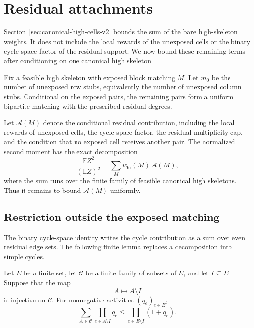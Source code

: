 
\section{Residual attachments}
\label{sec:residual-attachments-v2}

Section~\ref{sec:canonical-high-cells-v2} bounds the sum of the bare
high-skeleton weights.  It does not include the local rewards of the unexposed
cells or the binary cycle-space factor of the residual support.  We now bound
these remaining terms after conditioning on one canonical high skeleton.

Fix a feasible high skeleton with exposed block matching $M$.  Let $m_0$ be the
number of unexposed row stubs, equivalently the number of unexposed column
stubs.  Conditional on the exposed pairs, the remaining pairs form a uniform
bipartite matching with the prescribed residual degrees.

Let $\mathcal A(M)$ denote the conditional residual contribution, including the
local rewards of unexposed cells, the cycle-space factor, the residual
multiplicity cap, and the condition that no exposed cell receives another
pair.  The normalized second moment has the exact decomposition
\begin{equation}
  \frac{\mathbb E Z^2}{(\mathbb E Z)^2}
  =
  \sum_M w_{\mathrm{hi}}(M)\,\mathcal A(M),
  \label{eq:exact-attachment-decomposition-v2}
\end{equation}
where the sum runs over the finite family of feasible canonical high
skeletons.  Thus it remains to bound $\mathcal A(M)$ uniformly.

\subsection{Restriction outside the exposed matching}

The binary cycle-space identity writes the cycle contribution as a sum over
even residual edge sets.  The following finite lemma replaces a decomposition
into simple cycles.

\begin{lemma}
\label{lem:restriction-product-v2}
Let $E$ be a finite set, let $\mathcal C$ be a finite family of subsets of
$E$, and let $I\subseteq E$.  Suppose that the map
\[
  A\longmapsto A\setminus I
\]
is injective on $\mathcal C$.  For nonnegative activities $(q_e)_{e\in E}$,
\[
  \sum_{A\in\mathcal C}
    \prod_{e\in A\setminus I}q_e
  \le
  \prod_{e\in E\setminus I}(1+q_e).
\]
\end{lemma}

